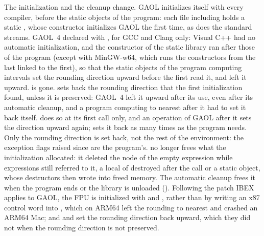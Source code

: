 \documentclass[12pt,a4paper,twoside,openright]{book}
\begin{document}
\medskip
The initialization and the cleanup change.\newinvfive{} GAOL initializes
itself with every compiler, before the static objects of the program: each
file including  holds a static
, whose constructor initializes GAOL the
first time, as  does the standard streams. GAOL~4
declared  with ,
for GCC and Clang only: Visual C++ had no automatic initialization, and the
constructor of the static library ran after those of the program (except with
MinGW-w64, which runs the constructors from the last linked to the first), so
that the static objects of the program computing intervals set the rounding
direction upward before the first  read it, and
 left it upward.  is gone.
 sets back the rounding direction that the first
initialization found, unless it is preserved: GAOL~4 left it upward after its
use, even after its automatic cleanup, and a program computing to nearest
after it had to set it back itself.  does so at its
first call only, and an operation of GAOL after it sets the direction upward
again;  sets it back as many times as the
program needs. Only the rounding direction is set back, not the rest of the
environment: the exception flags raised since are the program's.
 no longer frees what the initialization allocated: it
deleted the node of the empty expression while expressions still referred to
it, a local of  destroyed after the call or a static object,
whose destructors then wrote into freed memory. The automatic cleanup frees
it when the program ends or the library is unloaded ().
Following the patch IBEX applies to GAOL, the FPU is initialized with
 and , rather than by
writing an x87 control word into , which on ARM64 left the
rounding to nearest and crashed an ARM64 Mac; and 
and  set the rounding direction back upward, which they did
not when the rounding direction is not preserved.
\end{document}
